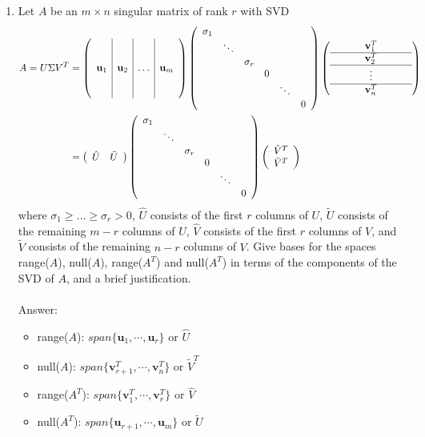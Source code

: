 \documentclass{article}
\renewcommand{\vec}[1]{\mathbf{#1}}
\begin{document}
\begin{enumerate}
\item Let $A$ be an $m \times n$ singular matrix of rank $r$ with SVD
\begin{align*}
A = U \Sigma V^T &= 
\left( \begin{array}{c|c|c|c} &&& \\ &&& \\ \vec{u}_1 & \vec{u}_2 & \ldots & \vec{u}_m \\ &&& \\ &&&  \end{array} \right)
\left( \begin{array}{cccccc} \sigma_1 &&&&& \\ & \ddots &&&& \\ && \sigma_r &&& \\ &&& 0 &&\\ &&&& \ddots &\\  &&&&& 0 \end{array} \right)
\left( \begin{array}{ccccccc} &&& \vec{v}_1^T &&& \\ \hline &&& \vec{v}_2^T &&& \\ \hline &&& \vdots &&& \\ \hline &&&
    \vec{v}_n^T &&&  \end{array} \right) \\
& = \left( \begin{array}{cc} \hat{U} & \tilde{U} \end{array} \right) 
\left( \begin{array}{cccccc} \sigma_1 &&&&& \\ & \ddots &&&& \\ && \sigma_r &&& \\ &&& 0 &&\\ &&&& \ddots &\\  &&&&& 0 \end{array} \right)
\left( \begin{array}{c} \hat{V}^T \\ \tilde{V}^T \end{array} \right) \\
\end{align*}
where $\sigma_1 \geq  \ldots \geq \sigma_r > 0$, $\hat{U}$ consists of the first $r$ columns of $U$, $\tilde{U}$ consists of the remaining $m-r$ columns of $U$,
$\hat{V}$ consists of the first $r$ columns of $V$, and $\tilde{V}$ consists of the remaining $n-r$ columns of $V$.
Give bases for the spaces range($A$), null($A$), range($A^T$) and null($A^T$) in terms of the components of the SVD of
$A$, and a brief justification.\\
\\
Answer:
\begin{itemize}
 \item range($A$): $span\{\vec{u}_1,\cdots,\vec{u}_r\}$ or $\hat{U}$
 \item null($A$): $span\{\vec{v}^T_{r+1},\cdots,\vec{v}^T_n\}$ or $\tilde{V}^T$
 \item range($A^T$): $span\{\vec{v}^T_1,\cdots,\vec{v}^T_r\}$ or $\hat{V}$
 \item null($A^T$): $span\{\vec{u}_{r+1},\cdots,\vec{u}_m\}$ or $\tilde{U}$
\end{itemize}


\end{enumerate}
\end{document}
